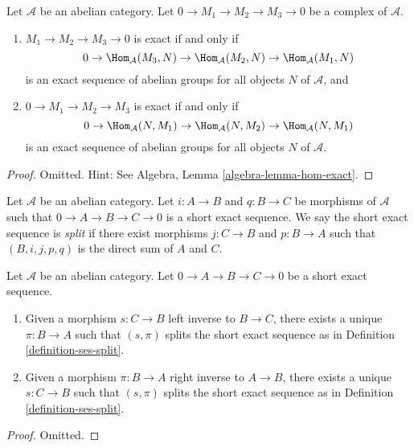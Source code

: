 \begin{lemma}
\label{lemma-check-exactness}
Let $\mathcal{A}$ be an abelian category.
Let $0 \to M_1 \to M_2 \to M_3 \to 0$ be a complex of $\mathcal{A}$.
\begin{enumerate}
\item $M_1 \to M_2 \to M_3 \to 0$ is exact if and only if
$$
0 \to \Hom_\mathcal{A}(M_3, N) \to
\Hom_\mathcal{A}(M_2, N) \to \Hom_\mathcal{A}(M_1, N)
$$
is an exact sequence of abelian groups for all objects $N$ of
$\mathcal{A}$, and
\item $0 \to M_1 \to M_2 \to M_3$ is exact if and only if
$$
0 \to \Hom_\mathcal{A}(N, M_1) \to \Hom_\mathcal{A}(N, M_2) \to
\Hom_\mathcal{A}(N, M_1)
$$
is an exact sequence of abelian groups for all objects $N$ of $\mathcal{A}$.
\end{enumerate}
\end{lemma}

\begin{proof}
Omitted. Hint: See
Algebra, Lemma \ref{algebra-lemma-hom-exact}.
\end{proof}

\begin{definition}
\label{definition-ses-split}
Let $\mathcal{A}$ be an abelian category.
Let $i : A \to B$ and $q : B \to C$ be morphisms
of $\mathcal{A}$ such that
$0 \to A \to B \to C \to 0$ is a short
exact sequence. We say the short exact
sequence is {\it split} if there exist
morphisms $j : C \to B$ and $p : B \to A$ such
that $(B, i, j, p, q)$ is the direct sum of $A$ and $C$.
\end{definition}

\begin{lemma}
\label{lemma-ses-split}
Let $\mathcal{A}$ be an abelian category.
Let $0 \to A \to B \to C \to 0$
be a short exact sequence.
\begin{enumerate}
\item Given a morphism $s : C \to B$ left inverse to
$B \to C$, there exists a unique $\pi : B \to A$
such that $(s, \pi)$ splits the short exact sequence
as in Definition \ref{definition-ses-split}.
\item Given a morphism $\pi : B \to A$ right inverse to
$A \to B$, there exists a unique $s : C \to B$
such that $(s, \pi)$ splits the short exact sequence
as in Definition \ref{definition-ses-split}.
\end{enumerate}
\end{lemma}

\begin{proof}
Omitted.
\end{proof}

